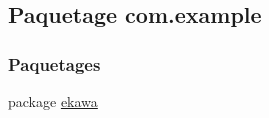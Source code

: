 \hypertarget{namespacecom_1_1example}{}\subsection{Paquetage com.\+example}
\label{namespacecom_1_1example}
\subsubsection*{Paquetages}
\begin{DoxyCompactItemize}
\item 
package \hyperlink{namespacecom_1_1example_1_1ekawa}{ekawa}
\end{DoxyCompactItemize}
